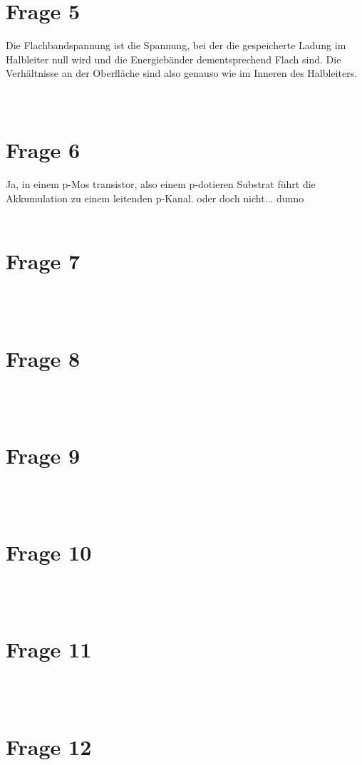 \documentclass[a4paper]{scrartcl}
\begin{document}
\section*{Frage 5}
Die Flachbandspannung ist die Spannung, bei der die gespeicherte Ladung im Halbleiter null wird und die Energiebänder dementsprechend Flach sind. Die Verhältnisse an der Oberfläche sind also genauso wie im Inneren des Halbleiters.
~\\
~\\
\section*{Frage 6}
Ja, in einem p-Mos transistor, also einem p-dotieren Substrat führt die Akkumulation zu einem leitenden p-Kanal. oder doch nicht... dunno %
~\\
~\\
\section*{Frage 7}

~\\
~\\
\section*{Frage 8}

~\\
~\\
\section*{Frage 9}

~\\
~\\
\section*{Frage 10}

~\\
~\\
\section*{Frage 11}

~\\
~\\
\section*{Frage 12}
\end{document}
